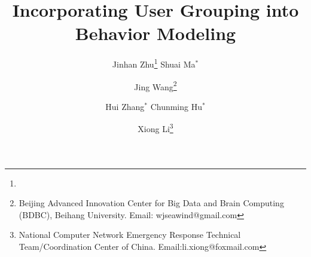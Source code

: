 \documentclass[twoside,leqno,twocolumn]{article}
\begin{document}
\title{\Large Incorporating User Grouping into \Retg{} Behavior Modeling}
\author{Jinhan Zhu\thanks{\beihang}\hspace{2ex} Shuai Ma$^{*}$\\
\and 
\hspace{-2ex} Jing Wang\thanks{Beijing Advanced Innovation Center for Big Data and Brain Computing (BDBC), Beihang University. Email: wjseawind@gmail.com}
\and
\hspace{2ex}Hui Zhang$^{*}$\hspace{2ex} Chunming Hu$^{*}$\\
\and
\hspace{-2ex}Xiong Li\thanks{National Computer Network Emergency Response Technical Team/Coordination Center of China. Email:li.xiong@foxmail.com}}
\date{}	

\date{}	

\maketitle



















%



\balance



\end{document}
